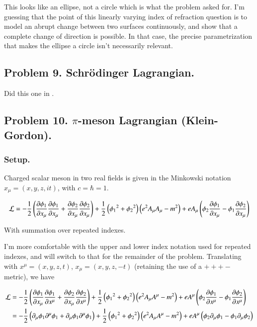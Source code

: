 This looks like an ellipse, not a circle which is what the problem asked for.  I'm guessing that the point of this 
linearly varying index of refraction question is to model an abrupt change between two surfaces continuously, and show that
a complete change of direction is possible.  In that case, the precise parametrization that makes the ellipse a circle isn't necessarily relevant.

\subsection{Problem 9.  Schr\"{o}dinger Lagrangian. }

Did this one in \citep{PJgoldch1}.

\subsection{Problem 10.  $\pi$-meson Lagrangian (Klein-Gordon). }

\subsubsection{Setup. }

Charged scalar meson in two real fields is given in the Minkowski notation $x_\mu = (x,y,z,it)$, with $c = \hbar = 1$.

\begin{align}
\LL = -\inv{2}\left( 
\PD{x_\mu}{\phi_1} \PD{x_\mu}{\phi_1} 
+ \PD{x_\mu}{\phi_2} \PD{x_\mu}{\phi_2} 
\right)
+ \inv{2}
\left( 
{\phi_1}^2 
+ {\phi_2}^2 
\right)
\left( e^2 A_\mu A_\mu - m^2 \right) 
+ e A_\mu \left(
\phi_2 \PD{x_\mu}{\phi_1}
-\phi_1 \PD{x_\mu}{\phi_2}
\right)
\end{align}

With summation over repeated indexes.

I'm more comfortable with the upper and lower index notation used for repeated indexes, and will switch to that for the remainder
of the problem.  Translating with $x^\mu = (x,y,z,t)$, $x_\mu = (x,y,z,-t)$ (retaining the use of a $+++-$ metric), we have

\begin{align}
\LL 
&= -\inv{2}\left( 
\PD{x_\mu}{\phi_1} \PD{x^\mu}{\phi_1} 
+ \PD{x_\mu}{\phi_2} \PD{x^\mu}{\phi_2} 
\right)
+ \inv{2}
\left( 
{\phi_1}^2 
+ {\phi_2}^2 
\right)
\left( e^2 A_\mu A^\mu - m^2 \right) 
+ e A^\mu \left(
\phi_2 \PD{x^\mu}{\phi_1}
-\phi_1 \PD{x^\mu}{\phi_2}
\right) \\
&= -\inv{2}\left( 
\partial_\mu \phi_1 \partial^\mu \phi_1
+\partial_\mu \phi_1 \partial^\mu \phi_1
\right)
+ \inv{2}
\left( 
{\phi_1}^2 
+ {\phi_2}^2 
\right)
\left( e^2 A_\mu A^\mu - m^2 \right) 
+ e A^\mu \left(
\phi_2 \partial_\mu {\phi_1}
-\phi_1 \partial_\mu {\phi_2}
\right) 
\end{align}

